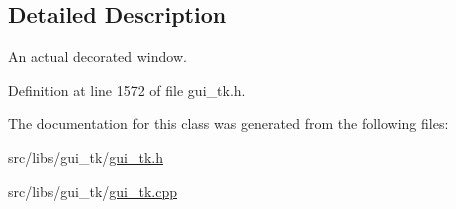 \subsection{Detailed Description}
An actual decorated window. 

Definition at line 1572 of file gui\-\_\-tk.\-h.



The documentation for this class was generated from the following files\-:\begin{DoxyCompactItemize}
\item 
src/libs/gui\-\_\-tk/\hyperlink{gui__tk_8h}{gui\-\_\-tk.\-h}\item 
src/libs/gui\-\_\-tk/\hyperlink{gui__tk_8cpp}{gui\-\_\-tk.\-cpp}\end{DoxyCompactItemize}
